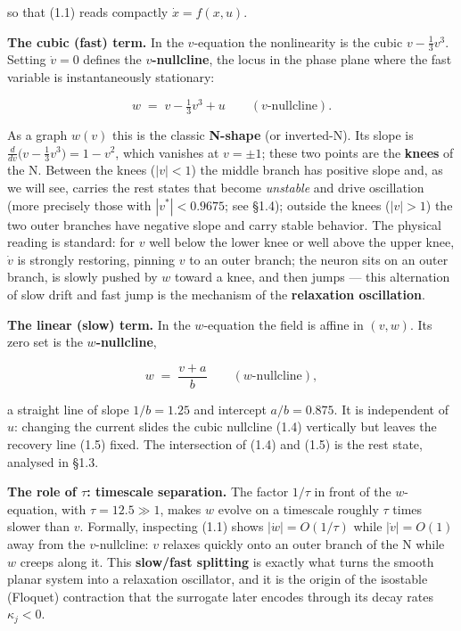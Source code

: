 \documentclass[
  11pt,
]{article}
\providecommand{\lt}{<}
\providecommand{\gt}{>}
\begin{document}
so that (1.1) reads compactly \(\dot x=f(x,u)\).

\textbf{The cubic (fast) term.} In the \(v\)-equation the nonlinearity
is the cubic \(v-\tfrac13 v^3\). Setting \(\dot v=0\) defines the
\textbf{\(v\)-nullcline}, the locus in the phase plane where the fast
variable is instantaneously stationary:

\[
w \;=\; v-\tfrac{1}{3}v^{3}+u
\qquad(\text{$v$-nullcline}).
\tag{1.4}
\]

As a graph \(w(v)\) this is the classic \textbf{N-shape} (or
inverted-N). Its slope is
\(\tfrac{d}{dv}\bigl(v-\tfrac13 v^3\bigr)=1-v^2\), which vanishes at
\(v=\pm 1\); these two points are the \textbf{knees} of the N. Between
the knees (\(|v|\lt 1\)) the middle branch has positive slope and, as we
will see, carries the rest states that become \emph{unstable} and drive
oscillation (more precisely those with \(|v^\ast|\lt 0.9675\); see
§1.4); outside the knees (\(|v|\gt 1\)) the two outer branches have
negative slope and carry stable behavior. The physical reading is
standard: for \(v\) well below the lower knee or well above the upper
knee, \(\dot v\) is strongly restoring, pinning \(v\) to an outer
branch; the neuron sits on an outer branch, is slowly pushed by \(w\)
toward a knee, and then jumps --- this alternation of slow drift and
fast jump is the mechanism of the \textbf{relaxation oscillation}.

\textbf{The linear (slow) term.} In the \(w\)-equation the field is
affine in \((v,w)\). Its zero set is the \textbf{\(w\)-nullcline},

\[
w \;=\; \frac{v+a}{b}
\qquad(\text{$w$-nullcline}),
\tag{1.5}
\]

a straight line of slope \(1/b=1.25\) and intercept \(a/b=0.875\). It is
independent of \(u\): changing the current slides the cubic nullcline
(1.4) vertically but leaves the recovery line (1.5) fixed. The
intersection of (1.4) and (1.5) is the rest state, analysed in §1.3.

\textbf{The role of \(\tau\): timescale separation.} The factor
\(1/\tau\) in front of the \(w\)-equation, with \(\tau=12.5\gg 1\),
makes \(w\) evolve on a timescale roughly \(\tau\) times slower than
\(v\). Formally, inspecting (1.1) shows \(|\dot w|=O(1/\tau)\) while
\(|\dot v|=O(1)\) away from the \(v\)-nullcline: \(v\) relaxes quickly
onto an outer branch of the N while \(w\) creeps along it. This
\textbf{slow/fast splitting} is exactly what turns the smooth planar
system into a relaxation oscillator, and it is the origin of the
isostable (Floquet) contraction that the surrogate later encodes through
its decay rates \(\kappa_j\lt 0\).
\end{document}
